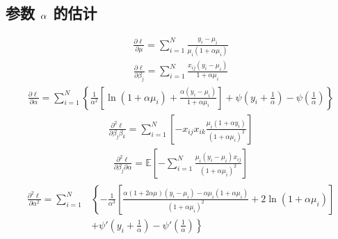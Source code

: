 \documentclass[letterpaper,10pt,english]{sphinxmanual}
\begin{document}
\subsection{参数 \protect\(\alpha\protect\) 的估计}
\label{\detokenize{_u8d1f_u4e8c_u9879_u6a21_u578b/content:id7}}\begin{equation}\label{equation:负二项模型/content:负二项模型/content:14}
\begin{split}\frac{\partial \ell }{\partial \mu}
=  \sum_{i=1}^N \frac{y_i - \mu_i}{\mu_i (1+\alpha \mu_i )}\end{split}
\end{equation}\begin{equation}\label{equation:负二项模型/content:负二项模型/content:15}
\begin{split}\frac{\partial \ell }{\partial \beta_j}
= \sum_{i=1}^N \frac{x_{ij} (y_i - \mu_i )}{1+\alpha \mu_i }\end{split}
\end{equation}\begin{equation}\label{equation:负二项模型/content:负二项模型/content:16}
\begin{split}\frac{\partial \ell }{\partial \alpha} =  \sum_{i=1}^N
\left \{
\frac{1}{\alpha^2} \left [ \ln(1+\alpha \mu_i) +\frac{\alpha(y_i - \mu_i)}{1+\alpha \mu_i}  \right ]
+ \psi \left ( y_i + \frac{1}{\alpha} \right )
- \psi \left ( \frac{1}{\alpha} \right )
\right \}\end{split}
\end{equation}\begin{equation}\label{equation:负二项模型/content:负二项模型/content:17}
\begin{split}\frac{\partial^2 \ell}{\partial \beta_j \beta_k} = \sum_{i=1}^N
\left [
-x_{ij}x_{ik} \frac{\mu_i(1+\alpha y_i)}{(1+\alpha \mu_i)^2}
\right ]\end{split}
\end{equation}\begin{equation}\label{equation:负二项模型/content:负二项模型/content:18}
\begin{split}\frac{\partial^2 \ell}{\partial \beta_j \partial \alpha } = \mathbb{E} \left [
- \sum_{i=1}^N
\frac{\mu_i(y_i - \mu_i)x_{ij}}{(1+\alpha \mu_i)^2}
\right ]\end{split}
\end{equation}\begin{align}\label{equation:负二项模型/content:负二项模型/content:19}\!\begin{aligned}
\frac{\partial^2 \ell}{\partial \alpha^2} = \sum_{i=1}^N
& \left \{
- \frac{1}{\alpha^3} \left [
\frac{\alpha(1+2\alpha \mu)(y_i-\mu_i) - \alpha \mu_i (1+\alpha \mu_i)}{(1+\alpha \mu_i)^2}
+ 2\ln(1+\alpha \mu_i)
\right ] \right.\\
& \left. + \psi' \left ( y_i + \frac{1}{\alpha} \right )
- \psi' \left (  \frac{1}{\alpha} \right )
\right \}\\
\end{aligned}\end{align}
\end{document}
